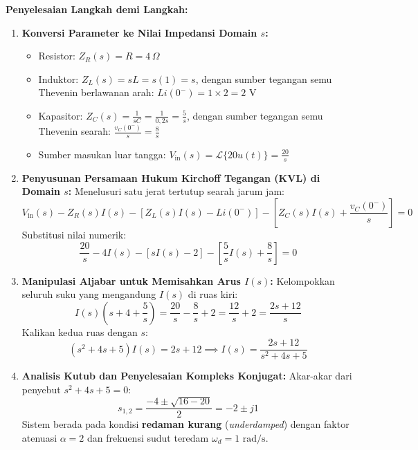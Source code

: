 \documentclass[11pt,a4paper]{article}
\theoremstyle{definition}
\begin{document}
\noindent\textbf{Penyelesaian Langkah demi Langkah:}
\begin{enumerate}[leftmargin=*]
    \item \textbf{Konversi Parameter ke Nilai Impedansi Domain $s$:}
    \begin{itemize}[leftmargin=*]
        \item Resistor: $Z_R(s) = R = 4\,\Omega$
        \item Induktor: $Z_L(s) = sL = s(1) = s$, dengan sumber tegangan semu Thevenin berlawanan arah: $L i(0^-) = 1 \times 2 = 2\text{ V}$
        \item Kapasitor: $Z_C(s) = \frac{1}{sC} = \frac{1}{0{,}2s} = \frac{5}{s}$, dengan sumber tegangan semu Thevenin searah: $\frac{v_C(0^-)}{s} = \frac{8}{s}$
        \item Sumber masukan luar tangga: $V_{\text{in}}(s) = \mathcal{L}\{20 u(t)\} = \frac{20}{s}$
    \end{itemize}
    
    \item \textbf{Penyusunan Persamaan Hukum Kirchoff Tegangan (KVL) di Domain $s$:}
    Menelusuri satu jerat tertutup searah jarum jam:
    \begin{equation*}
        V_{\text{in}}(s) - Z_R(s) I(s) - \left[ Z_L(s) I(s) - L i(0^-) \right] - \left[ Z_C(s) I(s) + \frac{v_C(0^-)}{s} \right] = 0
    \end{equation*}
    Substitusi nilai numerik:
    \begin{equation*}
        \frac{20}{s} - 4 I(s) - [s I(s) - 2] - \left[ \frac{5}{s} I(s) + \frac{8}{s} \right] = 0
    \end{equation*}
    
    \item \textbf{Manipulasi Aljabar untuk Memisahkan Arus $I(s)$:}
    Kelompokkan seluruh suku yang mengandung $I(s)$ di ruas kiri:
    \begin{equation*}
        I(s) \left( s + 4 + \frac{5}{s} \right) = \frac{20}{s} - \frac{8}{s} + 2 = \frac{12}{s} + 2 = \frac{2s + 12}{s}
    \end{equation*}
    Kalikan kedua ruas dengan $s$:
    \begin{equation*}
        (s^2 + 4s + 5) I(s) = 2s + 12 \implies I(s) = \frac{2s + 12}{s^2 + 4s + 5}
    \end{equation*}
    
    \item \textbf{Analisis Kutub dan Penyelesaian Kompleks Konjugat:}
    Akar-akar dari penyebut $s^2 + 4s + 5 = 0$:
    \begin{equation*}
        s_{1,2} = \frac{-4 \pm \sqrt{16 - 20}}{2} = -2 \pm j 1
    \end{equation*}
    Sistem berada pada kondisi \textbf{redaman kurang} (\textit{underdamped}) dengan faktor atenuasi $\alpha = 2$ dan frekuensi sudut teredam $\omega_d = 1\text{ rad/s}$.
    

\end{enumerate}
\end{document}
